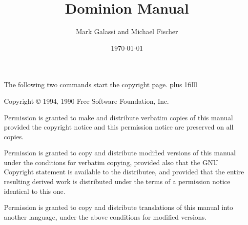 \pagestyle{headings}




\comment %
\comment %

\begin{tex}
\pagestyle{empty}
\title{Dominion Manual}
\author{Mark Galassi and Michael Fischer}
\date{\today}

\maketitle
\pagestyle{headings}
\tableofcontents

\comment  The following two commands start the copyright page.
\clearpage
\comment \vskip 0pt plus 1filll

Copyright \copyright{} 1994, 1990 Free Software Foundation, Inc.

Permission is granted to make and distribute verbatim copies of this manual
provided the copyright notice and this permission notice are preserved on
all copies.

Permission is granted to copy and distribute modified versions of this
manual under the conditions for verbatim copying, provided also that the
GNU Copyright statement is available to the distributee, and provided that
the entire resulting derived work is distributed under the terms of a
permission notice identical to this one.

Permission is granted to copy and distribute translations of this manual
into another language, under the above conditions for modified versions.

\clearpage
\end{tex}

